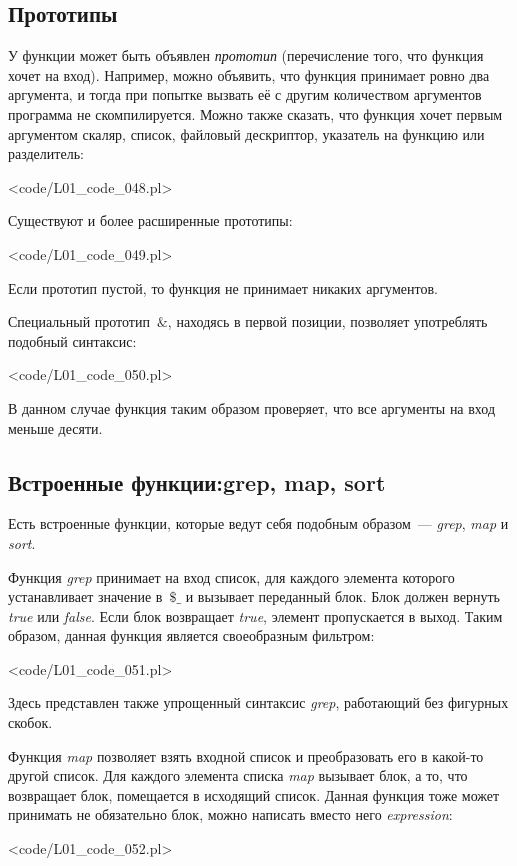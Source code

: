 \subsection{Прототипы}
У функции может быть объявлен \textit{прототип} (перечисление того, что функция хочет на вход).
Например, можно объявить, что функция принимает ровно два аргумента, и тогда при попытке вызвать её с другим количеством аргументов программа не скомпилируется.
Можно также сказать, что функция хочет первым аргументом скаляр, список, файловый дескриптор, указатель на функцию или разделитель:

\pr<code/L01_code_048.pl>

Существуют и более расширенные прототипы:

\pr<code/L01_code_049.pl>

Если прототип пустой, то функция не принимает никаких аргументов.

Специальный прототип~$\&$, находясь в первой позиции, позволяет употреблять подобный синтаксис:

\pr<code/L01_code_050.pl>

В данном случае функция таким образом проверяет, что все аргументы на вход меньше десяти.

\subsection{Встроенные функции:grep, map, sort}
Есть встроенные функции, которые ведут себя подобным образом~--- \textit{grep}, \textit{map} и \textit{sort}.

Функция \textit{grep} принимает на вход список, для каждого элемента которого устанавливает значение в~$\$\_$ и вызывает переданный блок.
Блок должен вернуть \textit{true} или \textit{false}.
Если блок возвращает \textit{true}, элемент пропускается в выход.
Таким образом, данная функция является своеобразным фильтром:

\pr<code/L01_code_051.pl>

Здесь представлен также упрощенный синтаксис \textit{grep}, работающий без фигурных скобок.

Функция \textit{map} позволяет взять входной список и преобразовать его в какой-то другой список.
Для каждого элемента списка \textit{map} вызывает блок, а то, что возвращает блок, помещается в исходящий список.
Данная функция тоже может принимать не обязательно блок, можно написать вместо него \textit{expression}:

\pr<code/L01_code_052.pl>

